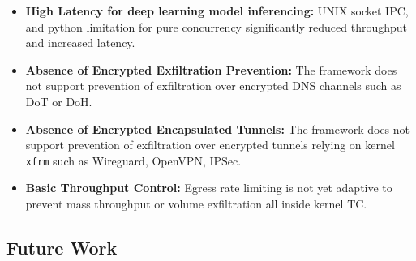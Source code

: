 \documentclass [11pt, proquest] {uwthesis}[2020/02/24]
\begin{document}
\begin{itemize}[itemsep=1pt,parsep=0pt]

  \item \textbf{High Latency for deep learning model inferencing:} UNIX socket IPC, and python limitation for pure concurrency significantly reduced throughput and increased latency. 

  \item \textbf{Absence of Encrypted Exfiltration Prevention:} The framework does not support prevention of exfiltration over encrypted DNS channels such as DoT or DoH.

  \item \textbf{Absence of Encrypted Encapsulated Tunnels:} The framework does not support prevention of exfiltration over encrypted tunnels relying on kernel \texttt{xfrm} such as Wireguard, OpenVPN, IPSec. 

  \item \textbf{Basic Throughput Control:} Egress rate limiting is not yet adaptive to prevent mass throughput or volume exfiltration all inside kernel TC. 
\end{itemize}

\subsection*{Future Work}
\end{document}
